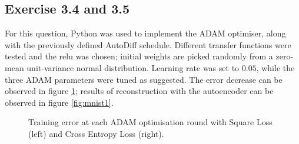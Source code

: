 \documentclass[fleqn]{report}
\begin{document}
\subsection*{Exercise 3.4 and 3.5}
For this question, Python was used to implement the ADAM optimiser, along with the previously defined AutoDiff schedule. Different transfer functions were tested and the relu was chosen; initial weights are picked randomly from a zero-mean unit-variance normal distribution. Learning rate was set to $0.05$, while the three ADAM parameters were tuned as suggested. The error decrease can be observed in figure \ref{fig:loss}; results of reconstruction with the autoencoder can be observed in figure \ref{fig:mnist1}.
\begin{figure}[H]
    \centering
    \qquad
    \caption{Training error at each ADAM optimisation round with Square Loss (left) and Cross Entropy Loss (right).}
    \label{fig:loss}
\end{figure}
\end{document}
